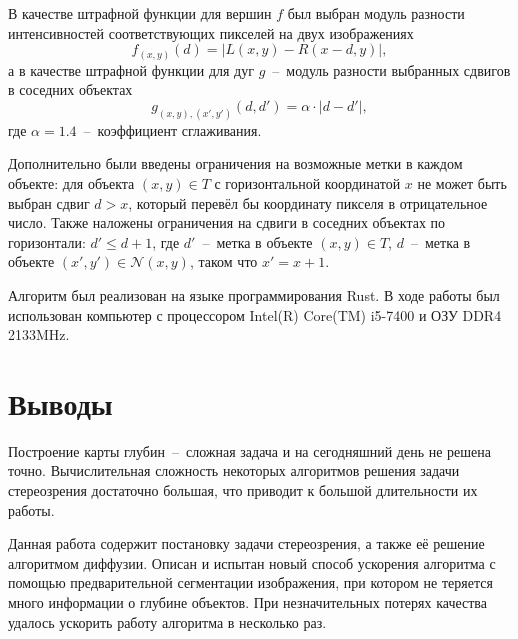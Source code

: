 \documentclass{ConfFTI}
\begin{document}
В качестве штрафной функции для вершин $f$ был выбран
модуль разности интенсивностей соответствующих пикселей на двух изображениях
\begin{equation*}
    f_{\left(x, y \right)} \left(d \right) =
    \left| L \left(x, y \right) - R \left( x - d, y \right) \right|,
\end{equation*}
а в качестве штрафной функции для дуг
$g$~--~модуль разности выбранных сдвигов в соседних объектах
\begin{equation*}
    g_{\left(x, y \right), \left(x', y' \right)} \left(d, d' \right) =
    \alpha \cdot \left| d - d' \right|,
\end{equation*}
где $\alpha = 1.4$~--~коэффициент сглаживания.

Дополнительно были введены ограничения на возможные метки в каждом объекте:
для объекта $\left(x, y \right) \in T$ с горизонтальной координатой $x$
не может быть выбран сдвиг $d > x$,
который перевёл бы координату пикселя в отрицательное число.
Также наложены ограничения на сдвиги в соседних объектах по горизонтали:
$d' \le d + 1$, где $d'$~--~метка в объекте $\left(x, y \right) \in T$,
$d$~--~метка в объекте $\left(x', y'\right) \in \mathcal{N}\left(x, y \right)$,
таком что $x' = x + 1$.

Алгоритм был реализован на языке программирования Rust.
В ходе работы был использован компьютер с процессором Intel(R) Core(TM) i5-7400
и ОЗУ DDR4 2133MHz.

\section*{Выводы}
Построение карты глубин~--~сложная задача и
на сегодняшний день не решена точно.
Вычислительная сложность некоторых алгоритмов решения задачи стереозрения
достаточно большая,
что приводит к большой длительности их работы.

Данная работа содержит постановку задачи стереозрения,
а также её решение алгоритмом диффузии.
Описан и испытан новый способ ускорения алгоритма с помощью
предварительной сегментации изображения,
при котором не теряется много информации о глубине объектов.
При незначительных потерях качества удалось ускорить работу алгоритма
в несколько раз.



\end{document}
